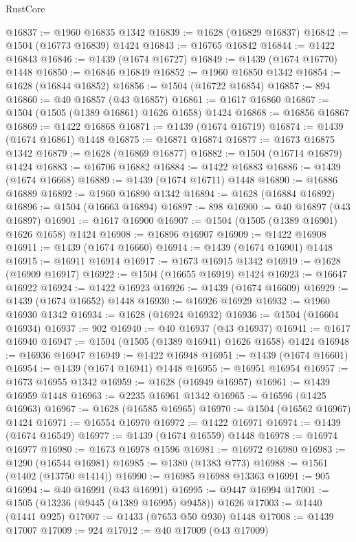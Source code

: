 \begin{lexlean}{RustCore}
\begin{coremodule}
@16837 := @1960 @16835 @1342
@16839 := @1628 (@16829 @16837)
@16842 := @1504 (@16773 @16839) @1424
@16843 := @16765 @16842
@16844 := @1422 @16843
@16846 := @1439 (@1674 @16727)
@16849 := @1439 (@1674 @16770) @1448
@16850 := @16846 @16849
@16852 := @1960 @16850 @1342
@16854 := @1628 (@16844 @16852)
@16856 := @1504 (@16722 @16854)
@16857 := 894
@16860 := @40 @16857 (@43 @16857)
@16861 := @1617 @16860
@16867 := @1504 (@1505 (@1389 @16861) @1626 @1658) @1424
@16868 := @16856 @16867
@16869 := @1422 @16868
@16871 := @1439 (@1674 @16719)
@16874 := @1439 (@1674 @16861) @1448
@16875 := @16871 @16874
@16877 := @1673 @16875 @1342
@16879 := @1628 (@16869 @16877)
@16882 := @1504 (@16714 @16879) @1424
@16883 := @16706 @16882
@16884 := @1422 @16883
@16886 := @1439 (@1674 @16668)
@16889 := @1439 (@1674 @16711) @1448
@16890 := @16886 @16889
@16892 := @1960 @16890 @1342
@16894 := @1628 (@16884 @16892)
@16896 := @1504 (@16663 @16894)
@16897 := 898
@16900 := @40 @16897 (@43 @16897)
@16901 := @1617 @16900
@16907 := @1504 (@1505 (@1389 @16901) @1626 @1658) @1424
@16908 := @16896 @16907
@16909 := @1422 @16908
@16911 := @1439 (@1674 @16660)
@16914 := @1439 (@1674 @16901) @1448
@16915 := @16911 @16914
@16917 := @1673 @16915 @1342
@16919 := @1628 (@16909 @16917)
@16922 := @1504 (@16655 @16919) @1424
@16923 := @16647 @16922
@16924 := @1422 @16923
@16926 := @1439 (@1674 @16609)
@16929 := @1439 (@1674 @16652) @1448
@16930 := @16926 @16929
@16932 := @1960 @16930 @1342
@16934 := @1628 (@16924 @16932)
@16936 := @1504 (@16604 @16934)
@16937 := 902
@16940 := @40 @16937 (@43 @16937)
@16941 := @1617 @16940
@16947 := @1504 (@1505 (@1389 @16941) @1626 @1658) @1424
@16948 := @16936 @16947
@16949 := @1422 @16948
@16951 := @1439 (@1674 @16601)
@16954 := @1439 (@1674 @16941) @1448
@16955 := @16951 @16954
@16957 := @1673 @16955 @1342
@16959 := @1628 (@16949 @16957)
@16961 := @1439 @16959 @1448
@16963 := @2235 @16961 @1342
@16965 := @16596 (@1425 @16963)
@16967 := @1628 (@16585 @16965)
@16970 := @1504 (@16562 @16967) @1424
@16971 := @16554 @16970
@16972 := @1422 @16971
@16974 := @1439 (@1674 @16549)
@16977 := @1439 (@1674 @16559) @1448
@16978 := @16974 @16977
@16980 := @1673 @16978 @1596
@16981 := @16972 @16980
@16983 := @1290 (@16544 @16981)
@16985 := @1380 (@1383 @773)
@16988 := @1561 (@1402 (@13750 @1414))
@16990 := @16985 @16988 @13363
@16991 := 905
@16994 := @40 @16991 (@43 @16991)
@16995 := @9447 @16994
@17001 := @1505 (@13236 (@9445 (@1389 @16995) @9458)) @1626
@17003 := @1440 (@1441 @925)
@17007 := @1433 (@7653 @50 @930) @1448
@17008 := @1439 @17007
@17009 := 924
@17012 := @40 @17009 (@43 @17009)

\end{coremodule}
\end{lexlean}
